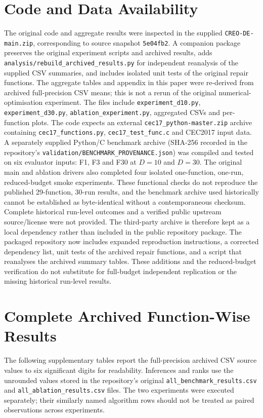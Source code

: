 \documentclass[journal]{IEEEtran}
\begin{document}
\section*{Code and Data Availability}

The original code and aggregate results were inspected in the supplied \texttt{CREO-DE-main.zip}, corresponding to source snapshot \texttt{5e04fb2}. A companion package preserves the original experiment scripts and archived results, adds \texttt{analysis/rebuild\_archived\_results.py} for independent reanalysis of the supplied CSV summaries, and includes isolated unit tests of the original repair functions. The aggregate tables and appendix in this paper were re-derived from archived full-precision CSV means; this is not a rerun of the original numerical-optimisation experiment. The files include \texttt{experiment\_d10.py}, \texttt{experiment\_d30.py}, \texttt{ablation\_experiment.py}, aggregated CSVs and per-function plots. The code expects an external \texttt{cec17\_python-master.zip} archive containing \texttt{cec17\_functions.py}, \texttt{cec17\_test\_func.c} and CEC2017 input data. A separately supplied Python/C benchmark archive (SHA-256 recorded in the repository's \texttt{validation/BENCHMARK\_PROVENANCE.json}) was compiled and tested on six evaluator inputs: F1, F3 and F30 at $D=10$ and $D=30$. The original main and ablation drivers also completed four isolated one-function, one-run, reduced-budget smoke experiments. These functional checks do not reproduce the published 29-function, 30-run results, and the benchmark archive used historically cannot be established as byte-identical without a contemporaneous checksum. Complete historical run-level outcomes and a verified public upstream source/license were not provided. The third-party archive is therefore kept as a local dependency rather than included in the public repository package. The packaged repository now includes expanded reproduction instructions, a corrected dependency list, unit tests of the archived repair functions, and a script that reanalyses the archived summary tables. These additions and the reduced-budget verification do not substitute for full-budget independent replication or the missing historical run-level results.

\clearpage
\onecolumn
\appendices
\section{Complete Archived Function-Wise Results}
\label{app:archive}
The following supplementary tables report the full-precision archived CSV source values to six significant digits for readability. Inferences and ranks use the unrounded values stored in the repository's original \texttt{all\_benchmark\_results.csv} and \texttt{all\_ablation\_results.csv} files. The two experiments were executed separately; their similarly named algorithm rows should not be treated as paired observations across experiments.
\end{document}
